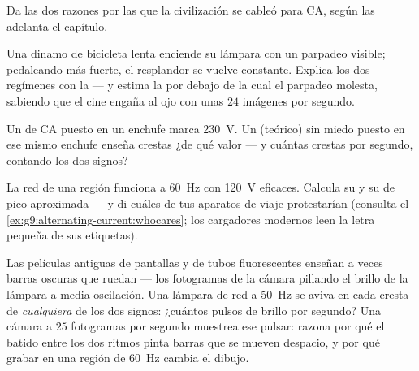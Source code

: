 \begin{exercise}[$\star$]\label{exo:g9:alternating-current:8}
Da las dos razones por las que la civilización se cableó para CA, según
las adelanta el capítulo.
\end{exercise}

\begin{exercise}[$\star\star$]\label{exo:g9:alternating-current:9}
Una dinamo de bicicleta lenta enciende su lámpara con un parpadeo
visible; pedaleando más fuerte, el resplandor se vuelve constante.
Explica los dos regímenes con la  --- y estima la
 por debajo de la cual el parpadeo molesta, sabiendo que
el cine engaña al ojo con unas $24$ imágenes por segundo.
\end{exercise}

\begin{exercise}[$\star\star$]\label{exo:g9:alternating-current:10}
Un  de CA puesto en un enchufe marca \qty{230}{V}. Un
 (teórico) sin miedo puesto en ese mismo enchufe enseña
crestas ¿de qué valor --- y cuántas crestas por segundo, contando los
dos signos?
\end{exercise}

\begin{exercise}[$\star\star$]\label{exo:g9:alternating-current:11}
La red de una región funciona a \qty{60}{Hz} con \qty{120}{V}
eficaces. Calcula su  y su  de pico
aproximada --- y di cuáles de tus aparatos de viaje protestarían
(consulta el \cref{ex:g9:alternating-current:whocares}; los cargadores
modernos leen la letra pequeña de sus etiquetas).
\end{exercise}

\begin{exercise}[$\star\star\star$]\label{exo:g9:alternating-current:12}
Las películas antiguas de pantallas y de tubos fluorescentes enseñan a
veces barras oscuras que ruedan --- los fotogramas de la cámara
pillando el brillo de la lámpara a media oscilación. Una lámpara de red
a \qty{50}{Hz} se aviva en cada cresta de \emph{cualquiera} de los dos
signos: ¿cuántos pulsos de brillo por segundo? Una cámara a $25$
fotogramas por segundo muestrea ese pulsar: razona por qué el batido
entre los dos ritmos pinta barras que se mueven despacio, y por qué
grabar en una región de \qty{60}{Hz} cambia el dibujo.
\end{exercise}

